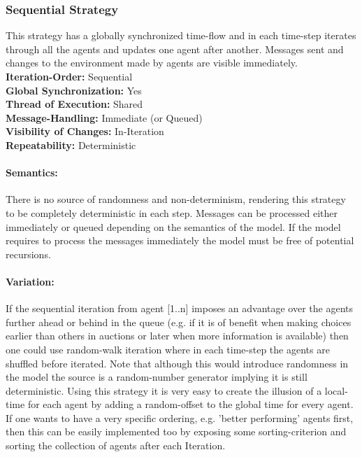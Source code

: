 \subsubsection{Sequential Strategy}
This strategy has a globally synchronized time-flow and in each time-step iterates through all the agents and updates one agent after another. Messages sent and changes to the environment made by agents are visible immediately. \\

\textbf{Iteration-Order:} Sequential \\
\textbf{Global Synchronization:} Yes \\
\textbf{Thread of Execution:} Shared \\
\textbf{Message-Handling:} Immediate (or Queued) \\
\textbf{Visibility of Changes:}	In-Iteration \\
\textbf{Repeatability:}	Deterministic 
	
\paragraph{Semantics:} There is no source of randomness and non-determinism, rendering this strategy to be completely deterministic in each step. Messages can be processed either immediately or queued depending on the semantics of the model. If the model requires to process the messages immediately the model must be free of potential recursions.

\paragraph{Variation:} If the sequential iteration from agent [1..n] imposes an advantage over the agents further ahead or behind in the queue (e.g. if it is of benefit when making choices earlier than others in auctions or later when more information is available) then one could use random-walk iteration where in each time-step the agents are shuffled before iterated. Note that although this would introduce randomness in the model the source is a random-number generator implying it is still deterministic. Using this strategy it is very easy to create the illusion of a local-time for each agent by adding a random-offset to the global time for every agent. If one wants to have a very specific ordering, e.g. 'better performing' agents first, then this can be easily implemented too by exposing some sorting-criterion and sorting the collection of agents after each Iteration.


